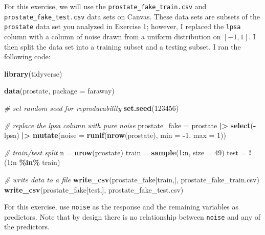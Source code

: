 \documentclass[
]{article}
\newenvironment{Shaded}{\begin{snugshade}}{\end{snugshade}}
\newcommand{\AttributeTok}[1]{\textcolor[rgb]{0.13,0.29,0.53}{#1}}
\newcommand{\CommentTok}[1]{\textcolor[rgb]{0.56,0.35,0.01}{\textit{#1}}}
\newcommand{\DecValTok}[1]{\textcolor[rgb]{0.00,0.00,0.81}{#1}}
\newcommand{\FunctionTok}[1]{\textcolor[rgb]{0.13,0.29,0.53}{\textbf{#1}}}
\newcommand{\NormalTok}[1]{#1}
\newcommand{\OtherTok}[1]{\textcolor[rgb]{0.56,0.35,0.01}{#1}}
\newcommand{\SpecialCharTok}[1]{\textcolor[rgb]{0.81,0.36,0.00}{\textbf{#1}}}
\newcommand{\StringTok}[1]{\textcolor[rgb]{0.31,0.60,0.02}{#1}}
\begin{document}
For this exercise, we will use the \texttt{prostate\_fake\_train.csv}
and \texttt{prostate\_fake\_test.csv} data sets on Canvas. These data
sets are subsets of the \texttt{prostate} data set you analyzed in
Exercise 1; however, I replaced the \texttt{lpsa} column with a column
of noise drawn from a uniform distribution on \([-1, 1]\). I then split
the data set into a training subset and a testing subset. I ran the
following code:

\begin{Shaded}
\begin{Highlighting}[]
\FunctionTok{library}\NormalTok{(tidyverse)}

\FunctionTok{data}\NormalTok{(prostate, }\AttributeTok{package =} \StringTok{\textquotesingle{}faraway\textquotesingle{}}\NormalTok{)}

\CommentTok{\# set random seed for reproducability}
\FunctionTok{set.seed}\NormalTok{(}\DecValTok{123456}\NormalTok{)}

\CommentTok{\# replace the lpsa column with pure noise}
\NormalTok{prostate\_fake }\OtherTok{=}\NormalTok{ prostate }\SpecialCharTok{|\textgreater{}} 
    \FunctionTok{select}\NormalTok{(}\SpecialCharTok{{-}}\NormalTok{lpsa) }\SpecialCharTok{|\textgreater{}} 
    \FunctionTok{mutate}\NormalTok{(}\AttributeTok{noise =} \FunctionTok{runif}\NormalTok{(}\FunctionTok{nrow}\NormalTok{(prostate), }\AttributeTok{min =} \SpecialCharTok{{-}}\DecValTok{1}\NormalTok{, }\AttributeTok{max =} \DecValTok{1}\NormalTok{))}

\CommentTok{\# train/test split}
\NormalTok{n }\OtherTok{=} \FunctionTok{nrow}\NormalTok{(prostate)}
\NormalTok{train }\OtherTok{=} \FunctionTok{sample}\NormalTok{(}\DecValTok{1}\SpecialCharTok{:}\NormalTok{n, }\AttributeTok{size =} \DecValTok{49}\NormalTok{)}
\NormalTok{test }\OtherTok{=} \SpecialCharTok{!}\NormalTok{(}\DecValTok{1}\SpecialCharTok{:}\NormalTok{n }\SpecialCharTok{\%in\%}\NormalTok{ train)}

\CommentTok{\# write data to a file}
\FunctionTok{write\_csv}\NormalTok{(prostate\_fake[train,], }\StringTok{\textquotesingle{}prostate\_fake\_train.csv\textquotesingle{}}\NormalTok{)}
\FunctionTok{write\_csv}\NormalTok{(prostate\_fake[test,], }\StringTok{\textquotesingle{}prostate\_fake\_test.csv\textquotesingle{}}\NormalTok{)}
\end{Highlighting}
\end{Shaded}

For this exercise, use \texttt{noise} as the response and the remaining
variables as predictors. Note that by design there is no relationship
between \texttt{noise} and any of the predictors.
\end{document}
